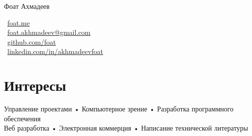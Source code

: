 \documentclass[10pt, a4paper]{article}
\makeatletter
\def\myauthor{Фоат Ахмадеев}
\def\myemail{foat.akhmadeev@gmail.com}
\def\mygithub{github.com/foat}
\def\mylinkedin{linkedin.com/in/akhmadeevfoat}
\def\myhomesite{foat.me}
\makeatother
\begin{document}
{\LARGE \myauthor}\\[1cm]
\begin{minipage}[t]{2in}
\end{minipage}
\begin{minipage}[t]{4in}
\flushleft
\faHome \, \href{http://\myhomesite}{\myhomesite}\\
\faEnvelopeAlt \, \href{mailto:\myemail}{\myemail}\\
\faGithub \, \href{https://\mygithub}{\mygithub}\\
\faLinkedin \, \href{https://\mylinkedin}{\mylinkedin}\\
\end{minipage}

\section*{Интересы}
Управление проектами • Компьютерное зрение • Разработка программного обеспечения\\
Веб разработка • Электронная коммерция • Написание технической литературы 
\end{document}
